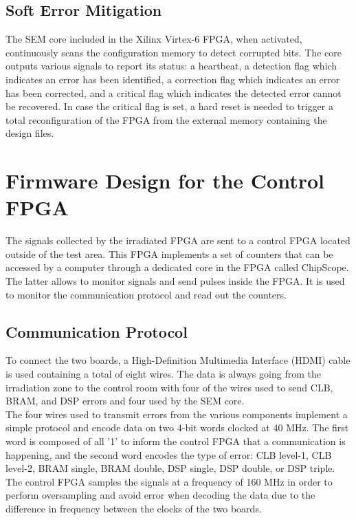     \subsection{Soft Error Mitigation}

      The SEM core included in the Xilinx Virtex-6 FPGA, when activated, continuously scans the configuration memory to detect corrupted bits. The core outputs various signals to report its status: a heartbeat, a detection flag which indicates an error has been identified, a correction flag which indicates an error has been corrected, and a critical flag which indicates the detected error cannot be recovered. In case the critical flag is set, a hard reset is needed to trigger a total reconfiguration of the FPGA from the external memory containing the design files.

  \section{Firmware Design for the Control FPGA}

    The signals collected by the irradiated FPGA are sent to a control FPGA located outside of the test area. This FPGA implements a set of counters that can be accessed by a computer through a dedicated core in the FPGA called ChipScope. The latter allows to monitor signals and send pulses inside the FPGA. It is used to monitor the communication protocol and read out the counters.

    \subsection{Communication Protocol}

      To connect the two boards, a High-Definition Multimedia Interface (HDMI) cable is used containing a total of eight wires. The data is always going from the irradiation zone to the control room with four of the wires used to send CLB, BRAM, and DSP errors and four used by the SEM core. \\

      The four wires used to transmit errors from the various components implement a simple protocol and encode data on two 4-bit words clocked at 40 MHz. The first word is composed of all '1' to inform the control FPGA that a communication is happening, and the second word encodes the type of error: CLB level-1, CLB level-2, BRAM single, BRAM double, DSP single, DSP double, or DSP triple. The control FPGA samples the signals at a frequency of 160 MHz in order to perform oversampling and avoid error when decoding the data due to the difference in frequency between the clocks of the two boards. \\

